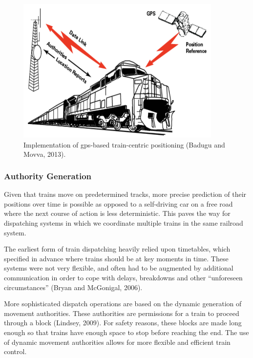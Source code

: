 \documentclass[11pt, titlepage]{article}
\begin{document}
\begin{figure}[ht]
    \begin{center}
        \includegraphics[width=4in]{PTCDiagram.png}
        \caption[GPS-Based Train-Centric Positioning]{Implementation of \gls{gps}-based
        train-centric positioning (Badugu and Movva, 2013).}
    \end{center}
\end{figure}

\subsubsection{Authority Generation}

Given that trains move on predetermined tracks, more precise prediction of their
positions over time is possible as opposed to a self-driving car on a free road
where the next course of action is less deterministic. This paves the way for
dispatching systems in which we coordinate multiple trains in the same railroad
system.

The earliest form of train dispatching heavily relied upon timetables, which
specified in advance where trains should be at key moments in time. These systems
were not very flexible, and often had to be augmented by additional communication
in order to cope with delays, breakdowns and other ``unforeseen circumstances''
(Bryan and McGonigal, 2006).

More sophisticated dispatch operations are based on the dynamic generation of
movement authorities. These authorities are permissions for a train to proceed
through a block (Lindsey, 2009). For safety reasons, these blocks are made long
enough so that trains have enough space to stop before reaching the end. The use of
dynamic movement authorities allows for more flexible and efficient train control.
\end{document}
